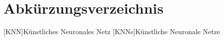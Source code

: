 \chapter*{Abkürzungsverzeichnis} 
\begin{acronym}
[KNN]{Künstliches Neuronales Netz}
[KNNs]{Künstliche Neuronale Netze}
\end{acronym}
